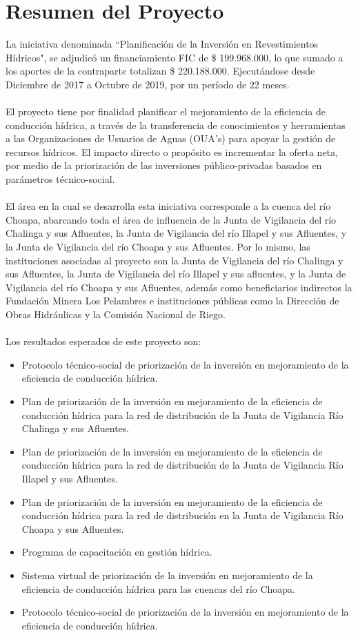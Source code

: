 \documentclass[]{article}
\begin{document}
\clearpage

\section{Resumen del Proyecto}

La iniciativa denominada ``Planificación de la Inversión en Revestimientos Hídricos", se adjudicó un financiamiento FIC de \$ 199.968.000, lo que sumado a los aportes de la contraparte totalizan \$ 220.188.000. Ejecutándose desde Diciembre de 2017 a Octubre de 2019, por un período de 22 meses.\\
\\
El proyecto tiene por finalidad planificar el mejoramiento de la eficiencia de conducción hídrica, a través de la transferencia de conocimientos y herramientas a las Organizaciones de Usuarios de Aguas (OUA's) para apoyar la gestión de recursos hídricos. El impacto directo o propósito es incrementar la oferta neta, por medio de la priorización de las inversiones público-privadas basados en parámetros técnico-social.\\
\\
El área en la cual se desarrolla esta iniciativa corresponde a la cuenca del río Choapa, abarcando toda el área de influencia de la Junta de Vigilancia del río Chalinga y sus Afluentes, la Junta de Vigilancia del río Illapel y sus Afluentes, y la Junta de Vigilancia del río Choapa y sus Afluentes. Por lo mismo, las instituciones asociadas al proyecto son la Junta de Vigilancia del río Chalinga y sus Afluentes, la Junta de Vigilancia del río Illapel y sus afluentes, y la Junta de Vigilancia del río Choapa y sus Afluentes, además como beneficiarios indirectos la Fundación Minera Los Pelambres e instituciones públicas como la Dirección de Obras Hidráulicas y la Comisión Nacional de Riego.\\
\\
Los resultados esperados de este proyecto son:
\begin{itemize}
\item Protocolo técnico-social de priorización de la inversión en mejoramiento de la eficiencia de conducción hídrica.
\item Plan de priorización de la inversión en mejoramiento de la eficiencia de conducción hídrica para la red de distribución de la Junta de Vigilancia Río Chalinga y sus Afluentes.
\item Plan de priorización de la inversión en mejoramiento de la eficiencia de conducción hídrica para la red de distribución de la Junta de Vigilancia Río Illapel y sus Afluentes.
\item Plan de priorización de la inversión en mejoramiento de la eficiencia de conducción hídrica para la red de distribución en la Junta de Vigilancia Río Choapa y sus Afluentes.
\item Programa de capacitación en gestión hídrica.
\item Sistema virtual de priorización de la inversión en mejoramiento de la eficiencia de conducción hídrica para las cuencas del río Choapa.
\item Protocolo técnico-social de priorización de la inversión en mejoramiento de la eficiencia de conducción hídrica.
\end{itemize}
\end{document}
